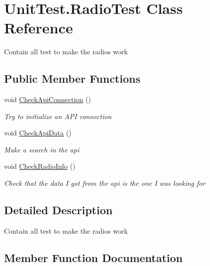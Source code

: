 \hypertarget{class_unit_test_1_1_radio_test}{}\section{Unit\+Test.\+Radio\+Test Class Reference}
\label{class_unit_test_1_1_radio_test}


Contain all test to make the radios work  


\subsection*{Public Member Functions}
\begin{DoxyCompactItemize}
\item 
void \hyperlink{class_unit_test_1_1_radio_test_a3f01b868a994c15be119989a8cc67f41}{Check\+Api\+Connection} ()
\begin{DoxyCompactList}\small\item\em Try to initialize an A\+PI connection \end{DoxyCompactList}\item 
void \hyperlink{class_unit_test_1_1_radio_test_aef2bff78a59914b1c75dc01013fa8d1a}{Check\+Api\+Data} ()
\begin{DoxyCompactList}\small\item\em Make a search in the api \end{DoxyCompactList}\item 
void \hyperlink{class_unit_test_1_1_radio_test_a3616a2504096bca4385994eee11aa116}{Check\+Radio\+Info} ()
\begin{DoxyCompactList}\small\item\em Check that the data I got from the api is the one I was looking for \end{DoxyCompactList}\end{DoxyCompactItemize}


\subsection{Detailed Description}
Contain all test to make the radios work 



\subsection{Member Function Documentation}
\mbox{\label{class_unit_test_1_1_radio_test_a3f01b868a994c15be119989a8cc67f41}} 
